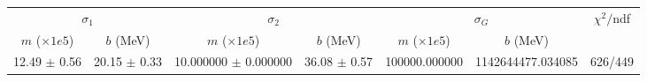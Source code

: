 \begin{tabular}{cc|cc|cc||c}
\multicolumn{2}{c|}{$\sigma_1$} & \multicolumn{2}{|c}{$\sigma_2$} & \multicolumn{2}{|c}{$\sigma_G$}  & \multirow{2}{*}{$\chi^2/$ndf}\\
$m$ ($\times1e5$) & $b$ (MeV) & $m$ ($\times1e5$) & $b$ (MeV) & $m$ ($\times1e5$) & $b$ (MeV) & \\
\hline
12.49 $\pm$ 0.56 & 20.15 $\pm$ 0.33 & 10.000000 $\pm$ 0.000000 & 36.08 $\pm$ 0.57 & 100000.000000 & 1142644477.034085 & 626/449\\
\end{tabular}
